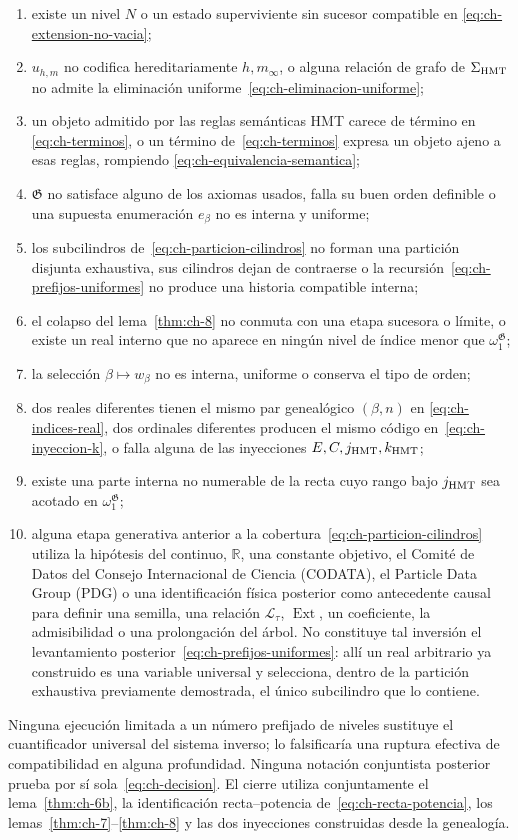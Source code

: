 \begin{enumerate}
\item existe un nivel \(N\) o un estado superviviente sin sucesor compatible en
\eqref{eq:ch-extension-no-vacia};
\item \(u_{h,m}\) no codifica hereditariamente \(h,m_\infty\), o alguna relación
de grafo de \(\Sigma_{\rm HMT}\) no admite la eliminación uniforme~\eqref{eq:ch-eliminacion-uniforme};
\item un objeto admitido por las reglas semánticas HMT carece de término en
\eqref{eq:ch-terminos}, o un término de~\eqref{eq:ch-terminos} expresa un objeto ajeno a esas reglas, rompiendo
\eqref{eq:ch-equivalencia-semantica};
\item \(\mathfrak G\) no satisface alguno de los axiomas usados, falla su buen
orden definible o una supuesta enumeración \(e_\beta\) no es interna y
uniforme;
\item los subcilindros de~\eqref{eq:ch-particion-cilindros} no forman una partición disjunta exhaustiva, sus
cilindros dejan de contraerse o la recursión~\eqref{eq:ch-prefijos-uniformes} no produce una
historia compatible interna;
\item el colapso del lema~\ref{thm:ch-8} no conmuta con una etapa sucesora o límite, o existe
un real interno que no aparece en ningún nivel de índice menor que
\(\omega_1^{\mathfrak G}\);
\item la selección \(\beta\mapsto w_\beta\) no es interna, uniforme o conserva
el tipo de orden;
\item dos reales diferentes tienen el mismo par genealógico \((\beta,n)\) en
\eqref{eq:ch-indices-real}, dos ordinales diferentes producen el mismo código en~\eqref{eq:ch-inyeccion-k}, o falla
alguna de las inyecciones \(E,C,j_{\rm HMT},k_{\rm HMT}\);
\item existe una parte interna no numerable de la recta cuyo rango bajo
\(j_{\rm HMT}\) sea acotado en \(\omega_1^{\mathfrak G}\);
\item alguna etapa generativa anterior a la cobertura~\eqref{eq:ch-particion-cilindros} utiliza la hipótesis del continuo,
\(\mathbb R\), una constante objetivo, el Comité de Datos del Consejo
Internacional de Ciencia (CODATA), el Particle Data Group (PDG) o una identificación física
posterior como antecedente causal para definir una semilla, una relación
\(\mathscr L_\tau\), \(\operatorname{Ext}\), un coeficiente, la admisibilidad
o una prolongación del árbol. No constituye tal inversión el levantamiento
posterior~\eqref{eq:ch-prefijos-uniformes}: allí un real arbitrario ya construido es una variable
universal y selecciona, dentro de la partición exhaustiva previamente
demostrada, el único subcilindro que lo contiene.
\end{enumerate}

Ninguna ejecución limitada a un número prefijado de niveles sustituye el
cuantificador universal del sistema inverso; lo falsificaría una ruptura
efectiva de compatibilidad en alguna profundidad. Ninguna notación conjuntista
posterior prueba por sí sola~\eqref{eq:ch-decision}. El cierre utiliza conjuntamente el
lema~\ref{thm:ch-6b}, la identificación recta--potencia de~\eqref{eq:ch-recta-potencia}, los
lemas~\ref{thm:ch-7}--\ref{thm:ch-8} y las dos inyecciones construidas desde
la genealogía.
